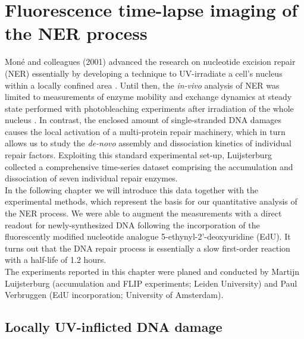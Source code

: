 \chapter{Fluorescence time-lapse imaging of the NER process}
\label{chap:quantData}
\pagestyle{plain}


Mon\'{e} and colleagues (2001) advanced the research on nucleotide excision repair (NER) essentially by developing a technique to UV-irradiate a cell's nucleus within a locally confined area \cite{Mone2001}. Until then, the \textit{in-vivo} analysis of NER was limited to measurements of enzyme mobility and exchange dynamics at steady state performed with photobleaching experiments after irradiation of the whole nucleus \cite{Houtsmuller2001,Mone2004,Vermeulen2011}. In contrast, the enclosed amount of single-stranded DNA damages causes the local activation of a multi-protein repair machinery, which in turn allows us to study the \textit{de-novo} assembly and dissociation kinetics of individual repair factors. Exploiting this standard experimental set-up, Luijsterburg  collected a comprehensive time-series dataset comprising the accumulation and dissociation of seven individual repair enzymes.\\ 
In the following chapter we will introduce this data together with the experimental methods, which represent the basis for our quantitative analysis of the NER process. We were able to augment the measurements with a direct readout for newly-synthesized DNA following the incorporation of the fluorescently modified nucleotide analogue 5-ethynyl-2'-deoxyuridine (EdU). It turns out that the DNA repair process is essentially a slow first-order reaction with a half-life of 1.2 hours.   \\


The experiments reported in this chapter were planed and conducted by Martijn Luijsterburg (accumulation and FLIP experiments; Leiden University) and Paul Verbruggen (EdU incorporation; University of Amsterdam).
	
	


\section{Locally UV-inflicted DNA damage}
\label{sec:local_irradiation}
 

